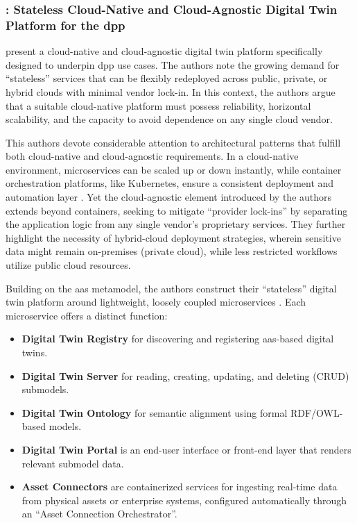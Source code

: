 \subsubsection*{\textcite{Redeker.2024}: Stateless Cloud-Native and Cloud-Agnostic Digital Twin Platform for the \ac{dpp}}
\textcite{Redeker.2024} present a cloud-native and cloud-agnostic digital twin platform specifically designed to underpin \ac{dpp} use cases. The authors note the growing demand for “stateless” services that can be flexibly redeployed across public, private, or hybrid clouds with minimal vendor lock-in. In this context, the authors argue that a suitable cloud-native platform must possess reliability, horizontal scalability, and the capacity to avoid dependence on any single cloud vendor. \autocite{Redeker.2024}

This authors devote considerable attention to architectural patterns that fulfill both cloud-native and cloud-agnostic requirements. In a cloud-native environment, microservices can be scaled up or down instantly, while container orchestration platforms, like Kubernetes, ensure a consistent deployment and automation layer \autocite{Dragoni.2017}. Yet the cloud-agnostic element introduced by the authors extends beyond containers, seeking to mitigate “provider lock-ins” by separating the application logic from any single vendor’s proprietary services. They further highlight the necessity of hybrid-cloud deployment strategies, wherein sensitive data might remain on-premises (private cloud), while less restricted workflows utilize public cloud resources. \autocite{Redeker.2024}

Building on the \ac{aas} metamodel, the authors construct their “stateless” digital twin platform around lightweight, loosely coupled microservices \autocite{Redeker.2024}. Each microservice offers a distinct function:

\begin{itemize}
    \item \textbf{Digital Twin Registry} for discovering and registering \ac{aas}-based digital twins.
    
    \item \textbf{Digital Twin Server} for reading, creating, updating, and deleting (CRUD) submodels.
    
    \item \textbf{Digital Twin Ontology} for semantic alignment using formal RDF/OWL-based models.
    
    \item \textbf{Digital Twin Portal} is an end-user interface or front-end layer that renders relevant submodel data.

    \item \textbf{Asset Connectors} are containerized services for ingesting real-time data from physical assets or enterprise systems, configured automatically through an “Asset Connection Orchestrator”.
\end{itemize}

